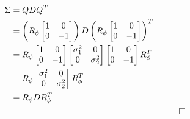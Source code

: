 \documentclass[a4paper, 12pt]{report}
\def\comment#1{\color{red}#1\color{black}}
\begin{document}
\begin{align}
	\Sigma&=QDQ^T \\
	&= \left(R_\phi \begin{bmatrix}
		1  &  0  \\
		0  &  -1
	\end{bmatrix}\right)D\left(R_\phi \begin{bmatrix}
		1  &  0  \\
		0  &  -1
	\end{bmatrix}\right)^T \\
	&= R_\phi \begin{bmatrix}
		1  &  0  \\
		0  &  -1
	\end{bmatrix} \begin{bmatrix}
		\sigma_1^2  &  0  \\
		0  &  \sigma_2^2
	\end{bmatrix} \begin{bmatrix}
		1  &  0  \\
		0  &  -1
	\end{bmatrix} R_\phi^T \\
	&= R_\phi \begin{bmatrix}
		\sigma_1^2  &  0  \\
		0  &  \sigma_2^2
	\end{bmatrix} R_\phi^T \\
	&= R_\phi D R_\phi^T \\&&\qed\nonumber
\end{align}

\newpage
\end{document}
